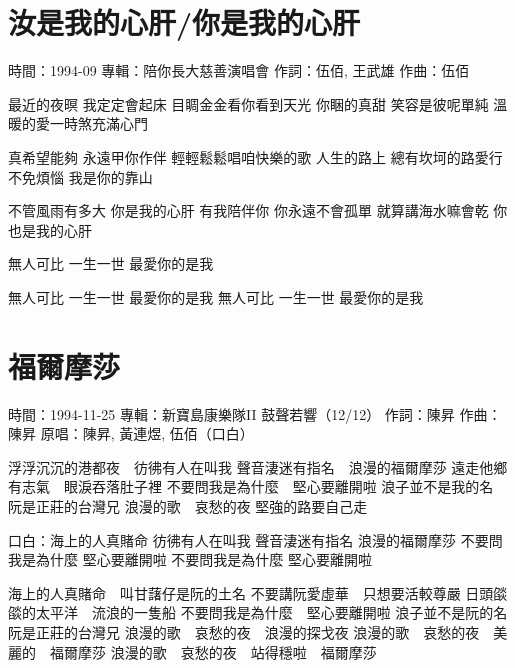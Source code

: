 \documentclass[UTF8,a4paper,oneside,twocolumn,12pt]{ctexbook}
\newcommand{\infopair}[2]{\textbullet #1：#2}
\newcommand{\zc}[1][伍佰]{\infopair{作詞}{#1}}
\newcommand{\zq}[1][伍佰]{\infopair{作曲}{#1}}
\newcommand{\zj}[1]{\infopair{專輯}{#1}}
\newcommand{\yc}[1]{\infopair{原唱}{#1}}
\newcommand{\sj}[1]{\infopair{時間}{#1}}
\newenvironment{info}{\begin{flushleft}\kaishu
	}
	{\end{flushleft}\normalsize\yahei\par}
\newenvironment{lyric}{
	}
{}
\begin{document}
\section{汝是我的心肝/你是我的心肝}
\begin{info}
	\sj{1994-09}
	\zj{陪你長大慈善演唱會}
	\zc[伍佰, 王武雄]
	\zq
\end{info}
\begin{lyric}
	最近的夜暝 我定定會起床 目睭金金看你看到天光
	你睏的真甜 笑容是彼呢單純 溫暖的愛一時煞充滿心門

	真希望能夠 永遠甲你作伴 輕輕鬆鬆唱咱快樂的歌
	人生的路上 總有坎坷的路愛行 不免煩惱 我是你的靠山

	不管風雨有多大 你是我的心肝 有我陪伴你 你永遠不會孤單
	就算講海水嘛會乾 你也是我的心肝

	無人可比 一生一世 最愛你的是我

	無人可比 一生一世 最愛你的是我
	無人可比 一生一世 最愛你的是我
\end{lyric}

\section{福爾摩莎}
\begin{info}%
	\sj{1994-11-25}
	\zj{新寶島康樂隊II 鼓聲若響（12/12）}
	\zc[陳昇]
	\zq[陳昇]
	\yc{陳昇, 黃連煜, 伍佰（口白）}
\end{info}
\begin{lyric}%
	浮浮沉沉的港都夜　彷彿有人在叫我
	聲音淒迷有指名　浪漫的福爾摩莎
	遠走他鄉有志氣　眼淚吞落肚子裡
	不要問我是為什麼　堅心要離開啦
	浪子並不是我的名　阮是正莊的台灣兄
	浪漫的歌　哀愁的夜
	堅強的路要自己走

	口白：海上的人真賭命
	彷彿有人在叫我
	聲音淒迷有指名
	浪漫的福爾摩莎
	不要問我是為什麼
	堅心要離開啦
	不要問我是為什麼
	堅心要離開啦﻿

	海上的人真賭命　叫甘藷仔是阮的土名
	不要講阮愛虛華　只想要活較尊嚴
	日頭燄燄的太平洋　流浪的一隻船
	不要問我是為什麼　堅心要離開啦
	浪子並不是阮的名　阮是正莊的台灣兄
	浪漫的歌　哀愁的夜　浪漫的探戈夜
	浪漫的歌　哀愁的夜　美麗的　福爾摩莎
	浪漫的歌　哀愁的夜　站得穩啦　福爾摩莎
\end{lyric}
\end{document}
